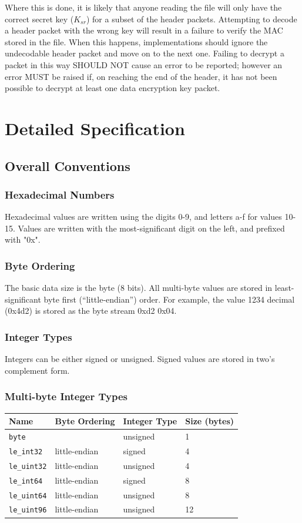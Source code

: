 \documentclass[10pt]{article}
\newcommand{\kw}[1]{\texttt{#1}}
\newcommand{\datatype}[1]{\kw{#1}}
\begin{document}
Where this is done, it is likely that anyone reading the file will only have the correct secret key ($K_{sr}$) for a
subset of the header packets.
Attempting to decode a header packet with the wrong key will result in a failure to verify the MAC stored in the file.
When this happens, implementations should ignore the undecodable header packet and move on to the next one.
Failing to decrypt a packet in this way SHOULD NOT cause an error to be reported;
however an error MUST be raised if, on reaching the end of the header,
it has not been possible to decrypt at least one data encryption key packet.

\section{Detailed Specification}
\subsection{Overall Conventions}
\subsubsection{Hexadecimal Numbers}
Hexadecimal values are written using the digits 0-9, and letters a-f for values 10-15.
Values are written with the most-significant digit on the left, and prefixed with "0x".

\subsubsection{Byte Ordering}
The basic data size is the byte (8 bits).
All multi-byte values are stored in least-significant byte first (``little-endian'') order.
For example, the value 1234 decimal (0x4d2) is stored as the byte stream 0xd2 0x04.

\subsubsection{Integer Types}
Integers can be either signed or unsigned.
Signed values are stored in two's complement form.

\subsubsection{Multi-byte Integer Types}
\begin{center}
\begin{tabular}{l l l l}
\hline
\textbf{Name} & \textbf{Byte Ordering} & \textbf{Integer Type} & \textbf{Size (bytes)} \\
\hline
\datatype{byte} & & unsigned & 1 \\
\datatype{le\_int32} & little-endian & signed & 4 \\
\datatype{le\_uint32} & little-endian & unsigned & 4 \\
\datatype{le\_int64} & little-endian & signed & 8 \\
\datatype{le\_uint64} & little-endian & unsigned & 8 \\
\datatype{le\_uint96} & little-endian & unsigned & 12 \\
\end{tabular}
\end{center}
\end{document}
